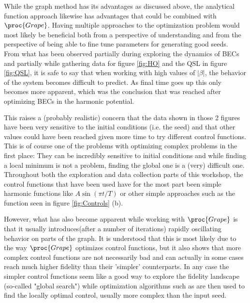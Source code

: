 \documentclass[aps,pra,reprint,superscriptaddress]{revtex4-1}
\begin{document}
While the graph method has its advantages as discussed above, the analytical function approach likewise has advantages that could be combined with $\proc{Grape}$. Having multiple approaches to the optimization problem would most likely be beneficial both from a perspective of understanding and from the perspective of being able to fine tune parameters for generating good seeds.\\

From what has been observed partially during exploring the dynamics of BECs and partially while gathering data for figure \ref{fig:HO} and the QSL in figure \ref{fig:QSL}, it is safe to say that when working with high values of $|\beta|$, the behavior of the system becomes difficult to predict. As final time goes up this only becomes more apparent, which was the conclusion that was reached after optimizing BECs in the harmonic potential. 

This raises a (probably realistic) concern that the data shown in those 2 figures have been very sensitive to the initial conditions (i.e. the seed) and that other values could have been reached given more time to try different control functions. This is of course one of the problems with optimizing complex problems in the first place: They can be incredibly sensitive to initial conditions and while finding a local minimum is not a problem, finding the global one is a (very) difficult one.\\

Throughout both the exploration and data collection parts of this workshop, the control functions that have been used have for the most part been simple harmonic functions like $A\sin(\pi t/T)$ or other simple approaches such as the function seen in figure \ref{fig:Controls} (b). 

However, what has also become apparent while working with $\proc{Grape}$ is that it usually introduces(after a number of iterations) rapidly oscillating behavior on parts of the graph. It is understood that this is most likely due to the way $\proc{Grape}$ optimizes control functions, but it also shows that more complex control functions are not necessarily bad and can actually in some cases reach much higher fidelity than their 'simpler' counterparts. In any case the simpler control functions seem like a good way to explore the fidelity landscape (so-called "global search") while optimization algorithms such as  are then used to find the locally optimal control, usually more complex than the input seed. \\
\end{document}
